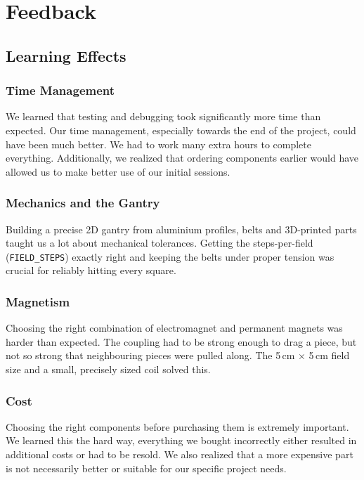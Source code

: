 \documentclass[10pt]{article}
\begin{document}
\label{tab:kosten}

\newpage

\section{Feedback}

\subsection{Learning Effects}

\subsubsection*{Time Management}
We learned that testing and debugging took significantly more time than expected. Our time management, especially towards the end of the project, could have been much better. We had to work many extra hours to complete everything. Additionally, we realized that ordering components earlier would have allowed us to make better use of our initial sessions.

\subsubsection*{Mechanics and the Gantry}
Building a precise 2D gantry from aluminium profiles, belts and 3D-printed parts taught us a lot about mechanical tolerances. Getting the steps-per-field (\texttt{FIELD\_STEPS}) exactly right and keeping the belts under proper tension was crucial for reliably hitting every square.

\subsubsection*{Magnetism}
Choosing the right combination of electromagnet and permanent magnets was harder than expected. The coupling had to be strong enough to drag a piece, but not so strong that neighbouring pieces were pulled along. The 5\,cm × 5\,cm field size and a small, precisely sized coil solved this.

\subsubsection*{Cost}
Choosing the right components before purchasing them is extremely important. We learned this the hard way, everything we bought incorrectly either resulted in additional costs or had to be resold. We also realized that a more expensive part is not necessarily better or suitable for our specific project needs.
\end{document}
